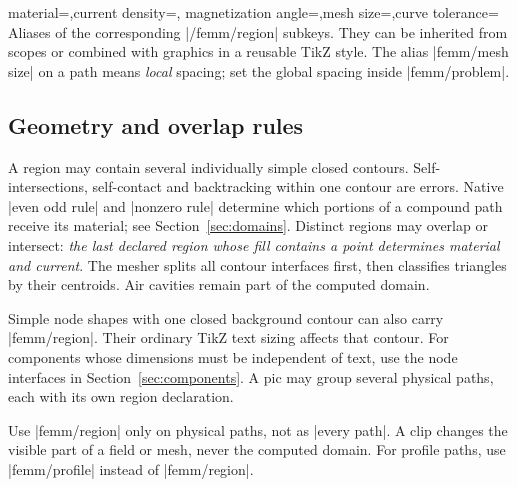 \begin{keylist}{material=,current density=,
  magnetization angle=,mesh size=,curve tolerance=}
Aliases of the corresponding |/femm/region| subkeys. They can be inherited
from scopes or combined with graphics in a reusable TikZ style.
The alias |femm/mesh size| on a path means \emph{local} spacing; set the
global spacing inside |femm/problem|.
\end{keylist}

\begin{codeexample}[width=5cm]
\end{codeexample}

\subsection{Geometry and overlap rules}
A region may contain several individually simple closed contours.
Self-intersections, self-contact and backtracking within one contour are
errors. Native |even odd rule| and |nonzero rule| determine which portions
of a compound path receive its material; see Section~\ref{sec:domains}.
Distinct regions may overlap or intersect: \emph{the last declared
region whose fill contains a point determines material and current}.
The mesher splits all contour interfaces first, then classifies triangles
by their centroids. Air cavities remain part of the computed domain.

Simple node shapes with one closed background contour can also carry
|femm/region|. Their ordinary TikZ text sizing affects that contour.
For components whose dimensions must be independent of text, use the
node interfaces in Section~\ref{sec:components}. A pic may group several
physical paths, each with its own region declaration.

Use |femm/region| only on physical paths, not as |every path|. A clip
changes the visible part of a field or mesh, never the computed domain.
For profile paths, use |femm/profile| instead of |femm/region|.

